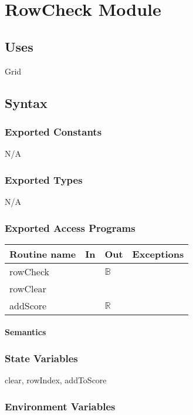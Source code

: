 \documentclass[12pt]{article}
\begin{document}
\newpage

\section* {RowCheck Module}

\subsection*{Uses}

Grid

\subsection*{Syntax}

\subsubsection*{Exported Constants}
N/A
\subsubsection*{Exported Types}

N/A

\subsubsection* {Exported Access Programs}

\begin{tabular}{| l | l | l | l |}
\hline
\textbf{Routine name} & \textbf{In} & \textbf{Out} & \textbf{Exceptions}\\
\hline
rowCheck & & $\mathbb{B}$ & \\
\hline
rowClear & &  & \\
\hline
addScore & & $\mathbb{R}$ & \\
\hline
\end{tabular}

\paragraph* {Semantics}

\subsubsection*{State Variables}

clear, rowIndex, addToScore

\subsubsection*{Environment Variables}
\end{document}
